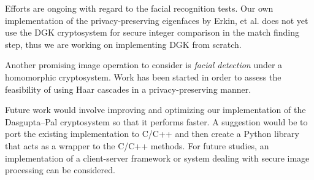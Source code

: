 Efforts are ongoing with regard to the facial recognition tests. Our own implementation of the privacy-preserving  eigenfaces by Erkin, et al. does not yet use the DGK cryptosystem for secure integer comparison in the match finding step, thus we are working on implementing DGK from scratch. 

Another promising image operation to consider is \textit{facial detection} under a homomorphic cryptosystem. Work has been started in order to assess the feasibility of using Haar cascades in a privacy-preserving manner.

Future work would involve improving and optimizing our implementation of the Dasgupta--Pal cryptosystem so that it performs faster. A suggestion would be to port the existing implementation to C/C++ and then create a Python library that acts as a wrapper to the C/C++ methods. For future studies, an implementation of a client-server framework or system dealing with secure image processing can be considered.



